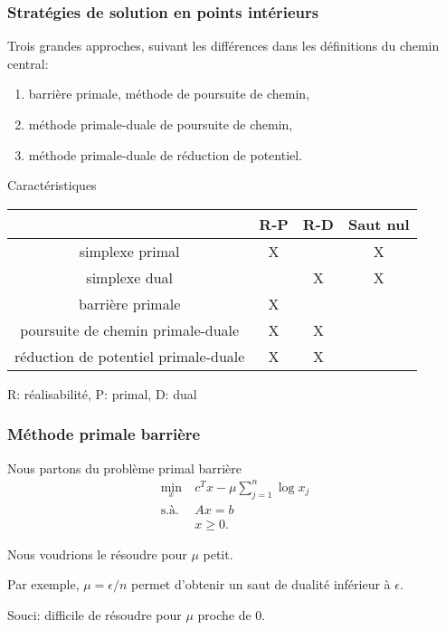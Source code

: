 \documentclass[usepdftitle=false, aspectratio=169]{beamer}
\begin{document}
\begin{frame}
\frametitle{Stratégies de solution en points intérieurs}

Trois grandes approches, suivant les différences dans les définitions du chemin central:
\begin{enumerate}
	\item
	barrière primale, méthode de poursuite de chemin,
	\item
	méthode primale-duale de poursuite de chemin,
	\item
	méthode primale-duale de réduction de potentiel.
\end{enumerate}

\mbox{}

Caractéristiques
\begin{tabular}{c|ccc}
	& R-P & R-D & Saut nul \\
	\hline
	simplexe primal & X & & X \\
	simplexe dual & & X & X\\
	barrière primale & X & & \\
	poursuite de chemin primale-duale & X & X & \\
	réduction de potentiel primale-duale & X & X & \\
\end{tabular}

R: réalisabilité, P: primal, D: dual

\end{frame}

\begin{frame}
\frametitle{Méthode primale barrière}

Nous partons du problème primal barrière
\begin{align*}
\min_x \ & c^Tx - \mu \sum_{j = 1}^n \log x_j \\
\mbox{s.à. } & Ax = b \\
& x \geq 0.
\end{align*}

\mbox{}

Nous voudrions le résoudre pour $\mu$ petit.

\mbox{}

Par exemple, $\mu = \epsilon/n$ permet d'obtenir un saut de dualité inférieur à $\epsilon$.

\mbox{}

Souci: difficile de résoudre pour $\mu$ proche de 0.

\end{frame}
\end{document}
